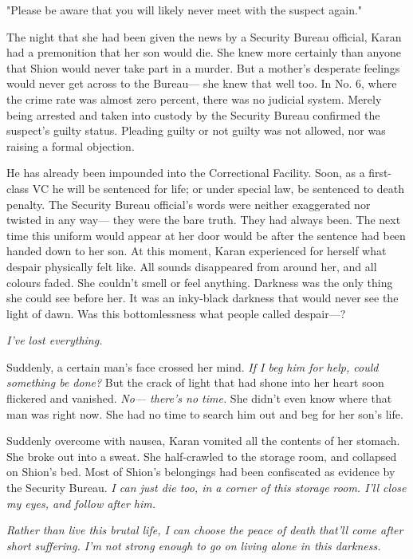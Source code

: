 "Please be aware that you will likely never meet with the suspect
again."

The night that she had been given the news by a Security Bureau
official, Karan had a premonition that her son would die. She knew more
certainly than anyone that Shion would never take part in a murder. But
a mother's desperate feelings would never get across to the Bureau--- she
knew that well too. In No. 6, where the crime rate was almost zero
percent, there was no judicial system. Merely being arrested and taken
into custody by the Security Bureau confirmed the suspect's guilty
status. Pleading guilty or not guilty was not allowed, nor was raising a
formal objection.

He has already been impounded into the Correctional Facility. Soon, as a
first-class VC he will be sentenced for life; or under special law, be
sentenced to death penalty. The Security Bureau official's words were
neither exaggerated nor twisted in any way--- they were the bare truth.
They had always been. The next time this uniform would appear at her
door would be after the sentence had been handed down to her son. At
this moment, Karan experienced for herself what despair physically felt
like. All sounds disappeared from around her, and all colours faded. She
couldn't smell or feel anything. Darkness was the only thing she could
see before her. It was an inky-black darkness that would never see the
light of dawn. Was this bottomlessness what people called despair---?

\emph{I've lost everything.}

Suddenly, a certain man's face crossed her mind. \emph{If I beg him for help,
could something be done?} But the crack of light that had shone into her
heart soon flickered and vanished. \emph{No--- there's no time.} She didn't even
know where that man was right now. She had no time to search him out and
beg for her son's life.

Suddenly overcome with nausea, Karan vomited all the contents of her
stomach. She broke out into a sweat. She half-crawled to the storage
room, and collapsed on Shion's bed. Most of Shion's belongings had been
confiscated as evidence by the Security Bureau.\emph{ I can just die too, in a
corner of this storage room. I'll close my eyes, and follow after him.}

\emph{Rather than live this brutal life, I can choose the peace of death
that'll come after short suffering. I'm not strong enough to go on
living alone in this darkness.}

